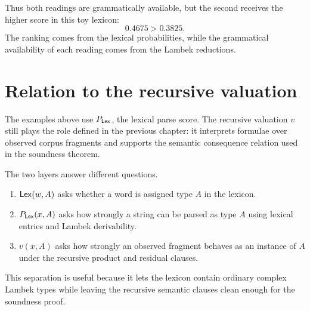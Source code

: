 Thus both readings are grammatically available, but the second receives the higher score in this
toy lexicon:
\[
0.4675 > 0.3825.
\]
The ranking comes from the lexical probabilities, while the grammatical availability of each
reading comes from the Lambek reductions.

\section{Relation to the recursive valuation}
The examples above use $P_{\mathsf{Lex}}$, the lexical parse score. The recursive valuation $v$ still plays
the role defined in the previous chapter: it interprets formulae over observed corpus fragments
and supports the semantic consequence relation used in the soundness theorem.

The two layers answer different questions.
\begin{enumerate}[label=(\roman*)]
    \item $\mathsf{Lex}(w,A)$ asks whether a word is assigned type $A$ in the lexicon.
    \item $P_{\mathsf{Lex}}(x,A)$ asks how strongly a string can be parsed as type $A$ using lexical entries and
    Lambek derivability.
    \item $v(x,A)$ asks how strongly an observed fragment behaves as an instance of $A$ under the
    recursive product and residual clauses.
\end{enumerate}
This separation is useful because it lets the lexicon contain ordinary complex Lambek types while
leaving the recursive semantic clauses clean enough for the soundness proof.
